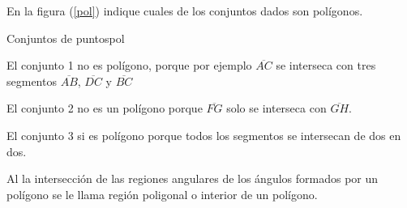 \documentclass[12pt]{book}
\begin{document}
\begin{ejemplo}{En la figura (\ref{pol}) indique cuales de los conjuntos dados son polígonos.}
\begin{figura}
{}{Conjuntos de puntos}{pol}
\end{figura}
\solucion
\begin{lista}
 \item El conjunto 1 no es polígono, porque por ejemplo $\overline{AC}$ se interseca
con tres segmentos $\overline{AB}$, $\overline{DC}$ y $\overline{BC}$
\item El conjunto 2 no es un polígono porque $\overline{FG}$ solo se interseca
con $\overline{GH}$.
\item El conjunto 3 si es polígono porque todos los segmentos se intersecan de dos en dos.
\end{lista}
\end{ejemplo}
\nota Al la intersección de las regiones angulares de los ángulos formados por un polígono se le llama región poligonal o interior de un polígono. 
\end{document}

